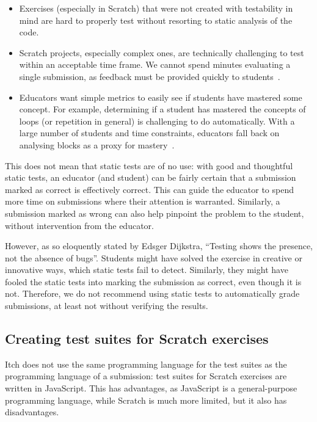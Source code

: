 \documentclass[../main]{subfiles}
\begin{document}
\begin{itemize}
    \item Exercises (especially in Scratch) that were not created with testability in mind are hard to properly test without resorting to static analysis of the code.
    \item Scratch projects, especially complex ones, are technically challenging to test within an acceptable time frame.
        We cannot spend minutes evaluating a single submission, as feedback must be provided quickly to students~\autocite{sarsaSpeedingAutomatedAssessment2022}.
    \item Educators want simple metrics to easily see if students have mastered some concept.
          For example, determining if a student has mastered the concepts of loops (or repetition in general) is challenging to do automatically.
          With a large number of students and time constraints, educators fall back on analysing blocks as a proxy for mastery~\autocite{combefisAutomatedCodeAssessment2022}.
\end{itemize}

This does not mean that static tests are of no use: with good and thoughtful static tests, an educator (and student) can be fairly certain that a submission marked as correct is effectively correct.
This can guide the educator to spend more time on submissions where their attention is warranted.
Similarly, a submission marked as wrong can also help pinpoint the problem to the student, without intervention from the educator.

However, as so eloquently stated by Edsger Dijkstra, ``Testing shows the presence, not the absence of bugs''.
Students might have solved the exercise in creative or innovative ways, which static tests fail to detect.
Similarly, they might have fooled the static tests into marking the submission as correct, even though it is not.
Therefore, we do not recommend using static tests to automatically grade submissions, at least not without verifying the results.

\subsection{Creating test suites for Scratch exercises}\label{subsec:creating-test-suites-for-scratch-exercises}

Itch does not use the same programming language for the test suites as the programming language of a submission: test suites for Scratch exercises are written in JavaScript.
This has advantages, as JavaScript is a general-purpose programming language, while Scratch is much more limited, but it also has disadvantages.
\end{document}
